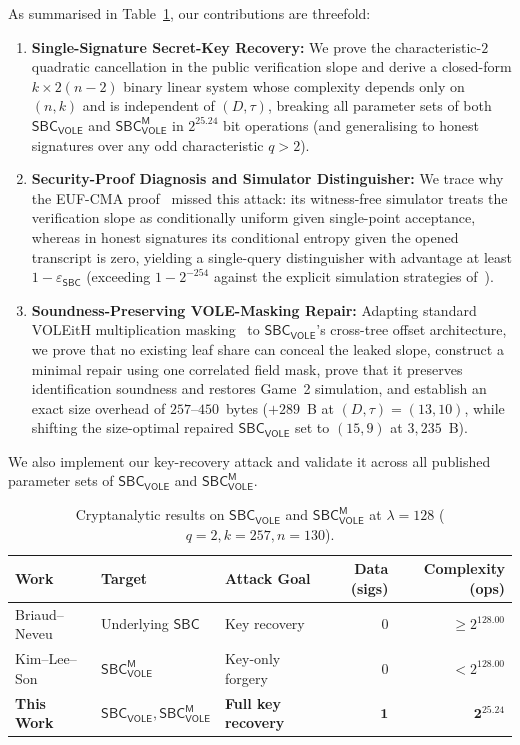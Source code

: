 \documentclass[11pt,a4paper]{article}
\theoremstyle{definition}
\theoremstyle{remark}
\newcommand{\SBC}{\mathsf{SBC}}
\newcommand{\SBCVOLE}{\mathsf{SBC}_{\mathsf{VOLE}}}
\newcommand{\SBCVOLEM}{\mathsf{SBC}_{\mathsf{VOLE}}^{\mathsf{M}}}
\begin{document}
As summarised in Table~\ref{tab:comparison}, our contributions are threefold:
\begin{enumerate}[leftmargin=2em]
    \item \textbf{Single-Signature Secret-Key Recovery:} We prove the characteristic-$2$ quadratic cancellation in the public verification slope and derive a closed-form $k \times 2(n-2)$ binary linear system whose complexity depends only on $(n, k)$ and is independent of $(D, \tau)$, breaking all parameter sets of both $\SBCVOLE$ and $\SBCVOLEM$ in $2^{25.24}$ bit operations (and generalising to honest signatures over any odd characteristic $q > 2$).
    \item \textbf{Security-Proof Diagnosis and Simulator Distinguisher:} We trace why the EUF-CMA proof~\cite[Appendix~A, full version]{HJ25} missed this attack: its witness-free simulator treats the verification slope as conditionally uniform given single-point acceptance, whereas in honest signatures its conditional entropy given the opened transcript is zero, yielding a single-query distinguisher with advantage at least $1 - \varepsilon_{\SBC}$ (exceeding $1 - 2^{-254}$ against the explicit simulation strategies of~\cite{HJ25}).
    \item \textbf{Soundness-Preserving VOLE-Masking Repair:} Adapting standard VOLEitH multiplication masking~\cite{YSWW21,BBDKORS23} to $\SBCVOLE$'s cross-tree offset architecture, we prove that no existing leaf share can conceal the leaked slope, construct a minimal repair using one correlated field mask, prove that it preserves identification soundness and restores Game~2 simulation, and establish an exact size overhead of $257$--$450$~bytes ($+289$~B at $(D, \tau) = (13, 10)$, while shifting the size-optimal repaired $\SBCVOLE$ set to $(15, 9)$ at $3{,}235$~B).
\end{enumerate}
We also implement our key-recovery attack and validate it across all published parameter sets of $\SBCVOLE$ and $\SBCVOLEM$.

\begin{table}[t]
\centering
\caption{Cryptanalytic results on $\SBCVOLE$ and $\SBCVOLEM$ at $\lambda = 128$ ($q = 2, k = 257, n = 130$).}
\label{tab:comparison}
\footnotesize
\setlength{\tabcolsep}{4.8pt}
\renewcommand{\arraystretch}{1.08}
\begin{tabular}{@{}lllrr@{}}
\toprule
\textbf{Work} & \textbf{Target} & \textbf{Attack Goal} & \textbf{Data (sigs)} & \textbf{Complexity (ops)} \\
\midrule
Briaud--Neveu~\cite{BN26} & Underlying $\SBC$ & Key recovery & $0$ & $\ge 2^{128.00}$ \\
Kim--Lee--Son~\cite{KLS25} & $\SBCVOLEM$ & Key-only forgery & $0$ & $< 2^{128.00}$ \\
\textbf{This Work} & $\SBCVOLE, \SBCVOLEM$ & \textbf{Full key recovery} & $\mathbf{1}$ & $\mathbf{2^{25.24}}$ \\
\bottomrule
\end{tabular}
\end{table}
\end{document}
